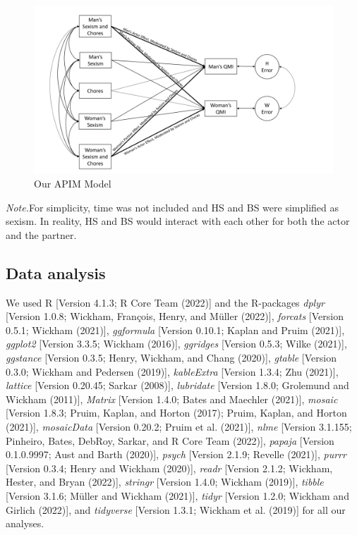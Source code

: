\documentclass[
  man]{apa6}
\begin{document}
\begin{figure}
\centering
\includegraphics{APIM.png}
\caption{Our APIM Model}
\end{figure}

\emph{Note.}For simplicity, time was not included and HS and BS were simplified as sexism. In reality, HS and BS would interact with each other for both the actor and the partner.

\hypertarget{data-analysis}{%
\subsection{Data analysis}\label{data-analysis}}

We used R {[}Version 4.1.3; R Core Team (2022){]} and the R-packages \emph{dplyr} {[}Version 1.0.8; Wickham, François, Henry, and Müller (2022){]}, \emph{forcats} {[}Version 0.5.1; Wickham (2021){]}, \emph{ggformula} {[}Version 0.10.1; Kaplan and Pruim (2021){]}, \emph{ggplot2} {[}Version 3.3.5; Wickham (2016){]}, \emph{ggridges} {[}Version 0.5.3; Wilke (2021){]}, \emph{ggstance} {[}Version 0.3.5; Henry, Wickham, and Chang (2020){]}, \emph{gtable} {[}Version 0.3.0; Wickham and Pedersen (2019){]}, \emph{kableExtra} {[}Version 1.3.4; Zhu (2021){]}, \emph{lattice} {[}Version 0.20.45; Sarkar (2008){]}, \emph{lubridate} {[}Version 1.8.0; Grolemund and Wickham (2011){]}, \emph{Matrix} {[}Version 1.4.0; Bates and Maechler (2021){]}, \emph{mosaic} {[}Version 1.8.3; Pruim, Kaplan, and Horton (2017); Pruim, Kaplan, and Horton (2021){]}, \emph{mosaicData} {[}Version 0.20.2; Pruim et al. (2021){]}, \emph{nlme} {[}Version 3.1.155; Pinheiro, Bates, DebRoy, Sarkar, and R Core Team (2022){]}, \emph{papaja} {[}Version 0.1.0.9997; Aust and Barth (2020){]}, \emph{psych} {[}Version 2.1.9; Revelle (2021){]}, \emph{purrr} {[}Version 0.3.4; Henry and Wickham (2020){]}, \emph{readr} {[}Version 2.1.2; Wickham, Hester, and Bryan (2022){]}, \emph{stringr} {[}Version 1.4.0; Wickham (2019){]}, \emph{tibble} {[}Version 3.1.6; Müller and Wickham (2021){]}, \emph{tidyr} {[}Version 1.2.0; Wickham and Girlich (2022){]}, and \emph{tidyverse} {[}Version 1.3.1; Wickham et al. (2019){]} for all our analyses.
\end{document}
